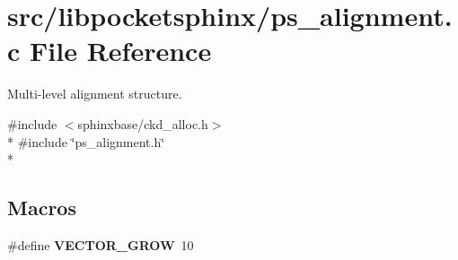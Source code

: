 \section{src/libpocketsphinx/ps\+\_\+alignment.c File Reference}
\label{ps__alignment_8c}


Multi-\/level alignment structure.  


{\ttfamily \#include $<$sphinxbase/ckd\+\_\+alloc.\+h$>$}\\*
{\ttfamily \#include \char`\"{}ps\+\_\+alignment.\+h\char`\"{}}\\*
\subsection*{Macros}
\begin{DoxyCompactItemize}
\item 
\#define {\bfseries V\+E\+C\+T\+O\+R\+\_\+\+G\+R\+O\+W}~10\label{ps__alignment_8c_af4a1705d5cc1103ccf95a9b5401d4c6e}

\end{DoxyCompactItemize}
